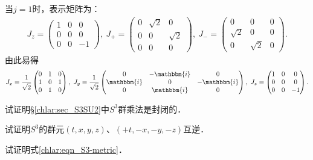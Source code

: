 \noindent  当$j=1$时，表示矩阵为：
\begin{align}
    J_z=\begin{pmatrix}
            1 & 0 & 0 \\   0 & 0 & 0 \\    0 & 0 & -1 
    \end{pmatrix},\
    J_{+}=\begin{pmatrix}
        0 & \sqrt{2} & 0 \\ 0 & 0 & \sqrt{2} \\ 0 & 0 & 0
    \end{pmatrix},\
    J_{-}=\begin{pmatrix}
        0 & 0 & 0\\ \sqrt{2} & 0 &0 \\ 0 & \sqrt{2} & 0
    \end{pmatrix}.
\end{align}
由此易得
\setlength{\mathindent}{0em}
\begin{align}
    J_{x}=\frac{1}{\sqrt{2}} \begin{pmatrix}
        0 & 1 & 0 \\ 1 & 0 & 1 \\ 0 & 1 & 0
    \end{pmatrix},\ 
    J_{y}=\frac{1}{\sqrt{2}}\begin{pmatrix}
        0 & -\mathbbm{i} & 0\\ \mathbbm{i} & 0 &-\mathbbm{i} \\ 0 & \mathbbm{i} & 0
    \end{pmatrix},\ 
    J_z=\begin{pmatrix}
        1 & 0 & 0 \\   0 & 0 & 0 \\    0 & 0 & -1 
    \end{pmatrix}.
\end{align}\setlength{\mathindent}{2em}



\begin{exercise}
	试证明\S\ref{chlar:sec_S3SU2}中$S^3$群乘法是封闭的．
\end{exercise}

\begin{exercise}
	试证明$S^3$的群元$(t,x,y,z)$、$(+t,-x,-y,-z)$互逆．
\end{exercise}

\begin{exercise}
	试证明式\eqref{chlar:eqn_S3-metric}．
\end{exercise}

